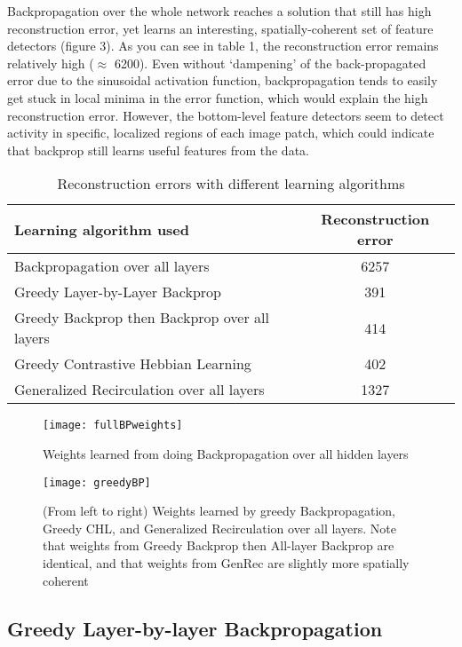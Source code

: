 \documentclass{article} %
\begin{document}
Backpropagation over the whole network reaches a solution that still has high reconstruction error, yet learns an interesting, spatially-coherent set of feature detectors (figure 3). As you can see in table 1, the reconstruction error remains relatively high ($\approx$ 6200). Even without `dampening' of the back-propagated error due to the sinusoidal activation function, backpropagation tends to easily get stuck in local minima in the error function, which would explain the high reconstruction error. 
However, the bottom-level feature detectors seem to detect activity in specific, localized regions of each image patch, which could indicate that backprop still learns useful features from the data. 

\begin{table}[t]
\caption{Reconstruction errors with different learning algorithms}
\begin{center}
\begin{tabular}{l|c|}
Learning algorithm used & Reconstruction error \\ \hline
Backpropagation over all layers & 6257 \\ %
Greedy Layer-by-Layer Backprop & 391 \\ %
Greedy Backprop then Backprop over all layers & 414 \\
Greedy Contrastive Hebbian Learning & 402 \\
Generalized Recirculation over all layers & 1327 
\end{tabular}
\end{center}
\end{table}


\begin{figure}[t]
\texttt{[image: fullBPweights]}
\caption{Weights learned from doing Backpropagation over all hidden layers}
\end{figure}

\begin{figure}[t]
\texttt{[image: greedyBP]}
\caption{(From left to right) Weights learned by greedy Backpropagation, Greedy CHL, and Generalized Recirculation over all layers. Note that weights from Greedy Backprop then All-layer Backprop are identical, and that weights from GenRec are slightly more spatially coherent}
\end{figure}


\subsection{Greedy Layer-by-layer Backpropagation}
\end{document}
